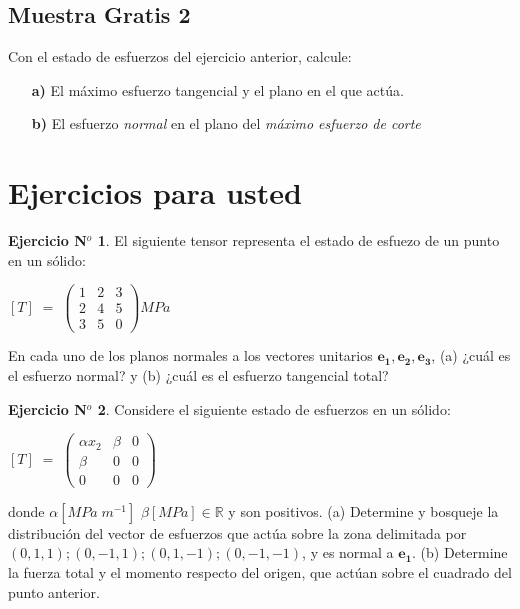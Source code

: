 \documentclass[12pt,a4paper]{article}
\theoremstyle{definition}
\newtheorem{theorem}{Ejercicio N$^o$}
\begin{document}
\subsection*{Muestra Gratis 2}
Con el estado de esfuerzos del ejercicio anterior, calcule:
\begin{itemize}
\item[\textbf{a)}] El máximo esfuerzo tangencial y el plano en el que actúa.
\item[\textbf{b)}] El esfuerzo \textit{normal} en el plano del \textit{máximo esfuerzo de corte}
\end{itemize}

\newpage


\section{Ejercicios para usted}
 \begin{theorem}
El siguiente tensor representa el estado de esfuezo de un punto en un sólido: 
 
 \begin{center}
$[T] \; = \;
\left(\begin{smallmatrix}
1 & 2 & 3\\
2 & 4 & 5\\
3 & 5 & 0
\end{smallmatrix}\right)
MPa
$
 \end{center}

En cada uno de los planos normales a los vectores unitarios $\mathbf{e_1, e_2, e_3}$, (a) ¿cuál es el esfuerzo normal? y (b) ¿cuál es el esfuerzo tangencial total?

\end{theorem}

\bigskip


\begin{theorem}
Considere el siguiente estado de esfuerzos en un sólido:

 \begin{center}
$[T] \; = \;
\left(\begin{smallmatrix}
\alpha x_2 & \beta & 0\\
\beta & 0 & 0\\
0 & 0 & 0
\end{smallmatrix}\right) 
$
 \end{center}
 \noindent donde $\alpha [MPa \; m^{-1}]$  $\beta [MPa] \in \mathbb{R}$ y son positivos.
 \noindent (a) Determine y bosqueje la distribución del vector de esfuerzos que actúa sobre la zona delimitada por $(0,1,1);(0,-1,1);(0,1,-1);(0,-1,-1)$, y es normal a $\mathbf{e_1}$. (b) Determine la fuerza total  y el momento respecto del origen, que actúan sobre el cuadrado del punto anterior.
\end{theorem}
\end{document}
